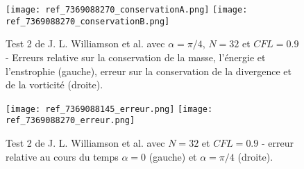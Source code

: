 \begin{figure}
\begin{center}
\texttt{[image: ref\_7369088270\_conservationA.png]}
\texttt{[image: ref\_7369088270\_conservationB.png]}
\end{center}
\caption{Test 2 de J. L. Williamson et al. \cite{Williamson1992} avec $\alpha=\pi/4$, $N=32$ et $CFL=0.9$ - Erreurs relative sur la conservation de la masse, l'énergie et l'enstrophie (gauche), erreur sur la conservation de la divergence et de la vorticité (droite).}
\label{fig: williamson 2 conservation alpha=pi/4}
\end{figure}




\begin{figure}
\begin{center}
\texttt{[image: ref\_7369088145\_erreur.png]}
\texttt{[image: ref\_7369088270\_erreur.png]}
\end{center}
\caption{Test 2 de J. L. Williamson et al. \cite{Williamson1992} avec $N=32$ et $CFL=0.9$ - erreur relative au cours du temps $\alpha = 0$ (gauche) et $\alpha = \pi/4$ (droite).}
\label{fig: williamson 2 erreur}
\end{figure}